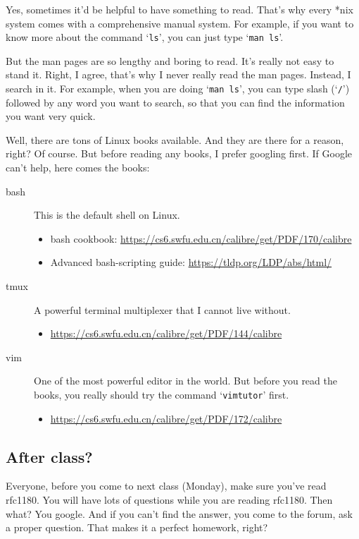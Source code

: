 \documentclass{article}
\begin{document}
Yes, sometimes it'd be helpful to have something to read. That's why every *nix
system comes with a comprehensive manual system. For example, if you want to know more
about the command `\texttt{ls}', you can just type `\texttt{man ls}'.

But the man pages are so lengthy and boring to read. It's really not easy to stand
it. Right, I agree, that's why I never really read the man pages. Instead, I search in
it. For example, when you are doing `\texttt{man ls}', you can type slash (`\texttt{/}')
followed by any word you want to search, so that you can find the information you want
very quick.

Well, there are tons of Linux books available. And they are there for a reason, right? Of
course. But before reading any books, I prefer googling first. If Google can't help, here
comes the books:
\begin{description}
\item[bash] This is the default shell on Linux.
  \begin{itemize}
  \item bash cookbook: \url{https://cs6.swfu.edu.cn/calibre/get/PDF/170/calibre}
  \item Advanced bash-scripting guide: \url{https://tldp.org/LDP/abs/html/}
  \end{itemize}
\item[tmux] A powerful terminal multiplexer that I cannot live without.
  \begin{itemize}
  \item \url{https://cs6.swfu.edu.cn/calibre/get/PDF/144/calibre}
  \end{itemize}
\item[vim] One of the most powerful editor in the world. But before you read the books,
  you really should try the command `\texttt{vimtutor}' first.
  \begin{itemize}
  \item \url{https://cs6.swfu.edu.cn/calibre/get/PDF/172/calibre}
  \end{itemize}
\end{description}



\subsection{After class?}
\label{sec:after-class}

Everyone, before you come to next class (Monday), make sure you've read rfc1180.  You will
have lots of questions while you are reading rfc1180. Then what? You google.  And if you
can't find the answer, you come to the forum, ask a proper question. That makes it a
perfect homework, right?
\end{document}
